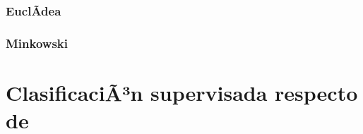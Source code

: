 \documentclass[10pt,a4paper]{article}
\begin{document}
\subsubsection{EuclÃ­dea}

\subsubsection{Minkowski}

\section{ClasificaciÃ³n supervisada respecto de }

%
%
%
%
%
%
%
%
%
\end{document}
